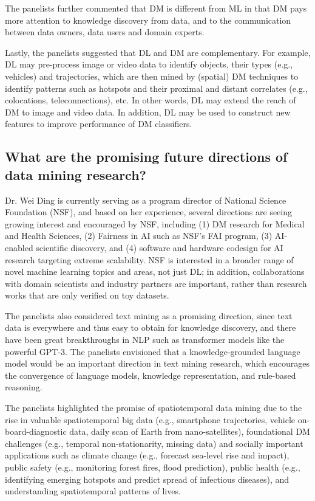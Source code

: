 \documentclass[11pt,dvipdfm]{article}
\begin{document}
The panelists further commented that DM is different from ML in that DM pays more attention to knowledge discovery from data, and to the communication between data owners, data users and domain experts.

Lastly, the panelists suggested that DL and DM are complementary. For example, DL may pre-process image or video data to identify objects, their types (e.g., vehicles) and trajectories, which are then mined by (spatial) DM techniques to identify patterns such as hotspots and their proximal and distant correlates (e.g., colocations, teleconnections), etc. In other words, DL may extend the reach of DM to image and video data. In addition, DL may be used to construct new features to improve performance of DM classifiers.

\subsection{What are the promising future directions of data mining research?}

Dr. Wei Ding is currently serving as a program director of National Science Foundation (NSF), and based on her experience, several directions are seeing growing interest and encouraged by NSF, including (1) DM research for Medical and Health Sciences, (2) Fairness in AI such as NSF’s FAI program, (3) AI-enabled scientific discovery, and (4) software and hardware codesign for AI research targeting extreme scalability. NSF is interested in a broader range of novel machine learning topics and areas, not just DL; in addition, collaborations with domain scientists and industry partners are important, rather than research works that are only verified on toy datasets.

The panelists also considered text mining as a promising direction, since text data is everywhere and thus easy to obtain for knowledge discovery, and there have been great breakthroughs in NLP such as transformer models like the powerful GPT-3. The panelists envisioned that a knowledge-grounded language model would be an important direction in text mining research, which encourages the convergence of language models, knowledge representation, and rule-based reasoning.

The panelists highlighted the promise of spatiotemporal data mining  due to the rise in valuable spatiotemporal big data (e.g., smartphone trajectories, vehicle on-board-diagnostic data, daily scan of Earth from nano-satellites), foundational DM challenges (e.g., temporal non-stationarity, missing data) and socially important applications such as climate change (e.g., forecast sea-level rise and impact), public safety (e.g., monitoring forest fires, flood prediction), public health (e.g., identifying emerging hotspots and predict spread of infectious diseases), and  understanding spatiotemporal patterns of lives.
\end{document}
